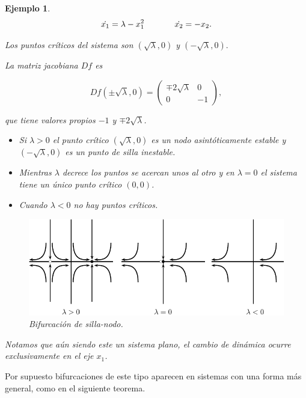 \documentclass[11pt]{book}
\theoremstyle{definition}
\numberwithin{definition}{section}
\theoremstyle{theorem}
\numberwithin{theorem}{section}
\numberwithin{lemma}{section}
\numberwithin{corollary}{section}
\theoremstyle{plain}
\newtheorem{example}{Ejemplo}
\numberwithin{example}{section}
\begin{document}
\begin{example}
$$ 
	\dot{x_1} = \lambda - x_1^2 \hspace{0.5in} \dot{x_2} = -x_2.
$$

Los puntos críticos del sistema son $(\sqrt{\lambda}, 0)$ y $(-\sqrt{\lambda}, 0).$

La matriz jacobiana $Df$ es

$$
Df(\pm \sqrt{\lambda}, 0) = \left( \begin{array}{ll}
	\mp 2 \sqrt{\lambda} & 0 \\
	0 & -1
\end{array} \right),
$$

que tiene valores propios $-1$ y $\mp 2\sqrt{\lambda}$.

\begin{itemize}
	\item Si $\lambda > 0$ el punto crítico $(\sqrt{\lambda}, 0)$ es un nodo asintóticamente estable y $(-\sqrt{\lambda}, 0)$ es un punto de silla inestable.
	\item Mientras $\lambda$ decrece los puntos se acercan unos al otro y en $\lambda = 0$ el sistema tiene un único punto crítico $(0,0)$.
	\item Cuando $\lambda < 0$ no hay puntos críticos.
\end{itemize}

\begin{figure}[ht] \centering
    \includegraphics[scale=1.0]{figures/bifurcations-saddlenode.pdf}
    \caption{Bifurcación de silla-nodo.}
\end{figure}

Notamos que aún siendo este un sistema plano, el cambio de dinámica ocurre exclusivamente en el eje $x_1$.
\end{example}

Por supuesto bifurcaciones de este tipo aparecen en sistemas con una forma más general, como en el siguiente teorema.
\end{document}
